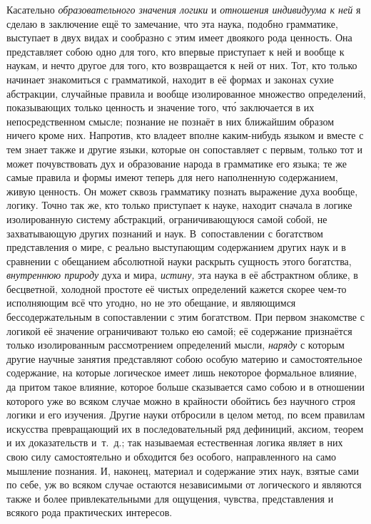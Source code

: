 Касательно {\em образовательного значения логики} и
{\em отношения индивидуума к ней} я сделаю в заключение
ещё то замечание, что эта наука, подобно грамматике, выступает в двух видах
и сообразно с этим имеет двоякого рода ценность. Она представляет собою
одно для того, кто впервые приступает к ней и вообще к наукам, и нечто
другое для того, кто возвращается к ней от них. Тот, кто только начинает
знакомиться с грамматикой, находит в её формах и законах сухие абстракции,
случайные правила и вообще изолированное множество определений,
показывающих только ценность и значение того, чт\'{о} заключается в их
непосредственном смысле; познание не познаёт в них ближайшим образом ничего
кроме них. Напротив, кто владеет вполне каким-нибудь языком и вместе с тем
знает также и другие языки, которые он сопоставляет с первым, только тот и
может почувствовать дух и образование народа в грамматике его языка; те же
самые правила и формы имеют теперь для него наполненную содержанием, живую
ценность. Он может сквозь грамматику познать выражение духа вообще, логику.
Точно так же, кто только приступает к науке, находит сначала в логике
изолированную систему абстракций, ограничивающуюся самой собой, не
захватывающую других познаний и наук. В~сопоставлении с богатством
представления о мире, с реально выступающим содержанием других наук и в
сравнении с обещанием абсолютной науки раскрыть сущность этого богатства,
{\em внутреннюю природу} духа и мира,
{\em истину,} эта наука в её абстрактном облике, в
бесцветной, холодной простоте её чистых определений кажется скорее чем-то
исполняющим всё что угодно, но не это обещание, и являющимся
бессодержательным в сопоставлении с этим богатством. При первом знакомстве
с логикой её значение ограничивают только ею самой; её содержание
признаётся только изолированным рассмотрением определений мысли,
{\em наряду} с которым другие научные занятия
представляют собою особую материю и самостоятельное содержание, на которые
логическое имеет лишь некоторое формальное влияние, да притом такое
влияние, которое больше сказывается само собою и в отношении которого уже
во всяком случае можно в крайности обойтись без научного строя логики и его
изучения. Другие науки отбросили в целом метод, по всем правилам искусства
превращающий их в последовательный ряд дефиниций, аксиом, теорем и их
доказательств и~т.~д.; так называемая естественная логика являет в них свою
силу самостоятельно и обходится без особого, направленного на само мышление
познания. И, наконец, материал и содержание этих наук, взятые сами по себе,
уж во всяком случае остаются независимыми от логического и являются также и
более привлекательными для ощущения, чувства, представления и всякого рода
практических интересов.

